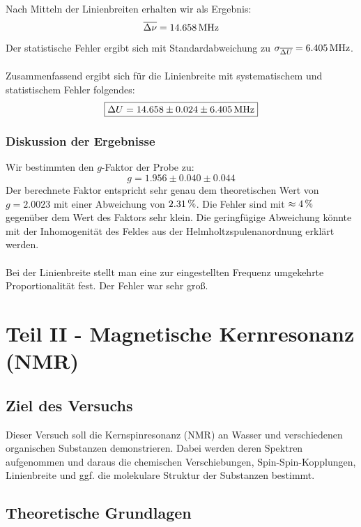 \documentclass[a4paper,titlepage]{scrartcl}
\numberwithin{equation}{section}
\begin{document}
Nach Mitteln der Linienbreiten erhalten wir als Ergebnis:
\begin{equation*}
\overline{\Delta \nu}=\unit[14.658]{MHz}
\end{equation*}
Der statistische Fehler ergibt sich mit Standardabweichung zu $\sigma_{\overline{\Delta U}}=\unit[6.405]{MHz}$.\\ \\
Zusammenfassend ergibt sich für die Linienbreite mit systematischem und statistischem Fehler folgendes:
\begin{equation}
\boxed{\Delta U=\unit[14.658 \pm 0.024 \pm 6.405]{MHz}}
\end{equation}
\subsubsection{Diskussion der Ergebnisse}
Wir bestimmten den $g$-Faktor der Probe zu:
\begin{equation*}
\boxed{g=1.956 \pm 0.040 \pm 0.044}
\end{equation*}
Der berechnete Faktor entspricht sehr genau dem theoretischen Wert von $g=2.0023$ mit einer Abweichung von $\unit[2.31]{\%}$. Die Fehler sind mit $\approx \unit[4]{\%}$ gegenüber dem Wert des Faktors sehr klein. Die geringfügige Abweichung könnte mit der Inhomogenität des Feldes aus der Helmholtzspulenanordnung erklärt werden.\\ \\
Bei der Linienbreite stellt man eine zur eingestellten Frequenz umgekehrte Proportionalität fest. Der Fehler war sehr groß.
\newpage
\section{Teil II - Magnetische Kernresonanz (NMR)}
\subsection{Ziel des Versuchs}
Dieser Versuch soll die Kernspinresonanz (NMR) an Wasser und verschiedenen organischen Substanzen demonstrieren. Dabei werden deren Spektren aufgenommen und daraus die chemischen Verschiebungen, Spin-Spin-Kopplungen, Linienbreite und ggf. die molekulare Struktur der Substanzen bestimmt.
\subsection{Theoretische Grundlagen}
\end{document}
